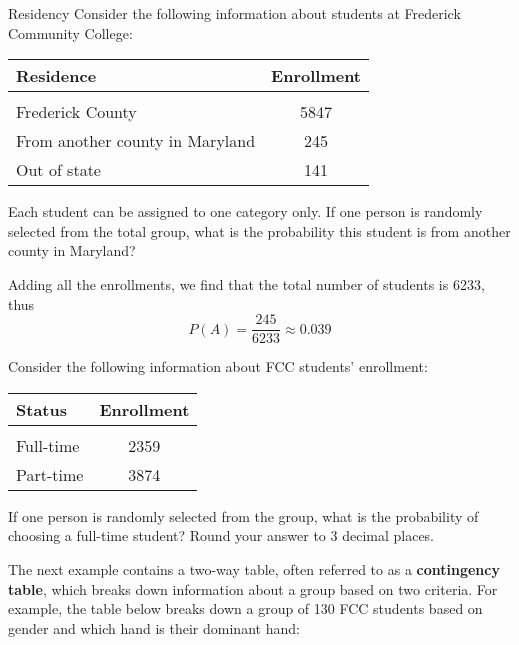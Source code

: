 \begin{example}[https://www.youtube.com/watch?v=odsxeO7wjqk&list=PLfmpjsIzhzts14-9s5QixRje97EI2oeMF&index=7]{Residency}
Consider the following information about students at Frederick Community College:

\begin{center}
\begin{tabular}{l c}
\textbf{Residence} & \textbf{Enrollment} \\ \hline 
& \\
Frederick County & 5847\\ 
From another county in Maryland  & 245  \\  
Out of state & 141 \\ 
\end{tabular}
\end{center}

Each student can be assigned to one category only. If one person is randomly selected from the total group, what is the probability this student is from another county in Maryland?  

\sol
Adding all the enrollments, we find that the total number of students is 6233, thus
\[  P(A) = \boxed{\frac{245}{6233} \approx 0.039} \]
\end{example}

\begin{try}
Consider the following information about FCC students' enrollment:

\begin{center}
\begin{tabular}{l c}
\textbf{Status} & \textbf{Enrollment} \\ \hline 
& \\
Full-time & 2359 \\ 
Part-time & 3874 \\  
\end{tabular}
\end{center}

If one person is randomly selected from the group, what is the probability of choosing a full-time student? Round your answer to 3 decimal places. 
\end{try}

The next example contains a two-way table, often referred to as a \textbf{contingency table}, which breaks down information about a group based on two criteria.  For example, the table below breaks down a group of 130 FCC students based on gender and which hand is their dominant hand:

